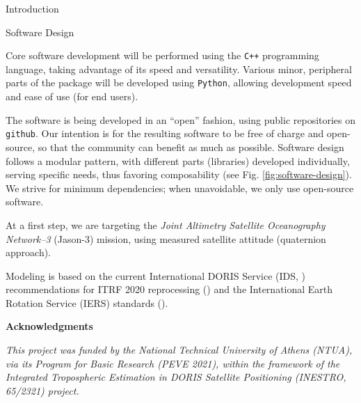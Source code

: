 \documentclass[final,a0,portrait]{beamer}
\newlength{\onecolwid}
\begin{document}
\begin{frame}[t]
\begin{columns}[t]
\begin{column}{\onecolwid}
\begin{block}{Introduction}
\end{block}

\begin{block}{Software Design}
{\small
Core software development will be performed using the \texttt{C++} programming 
language, taking advantage of its speed and versatility. Various minor, 
peripheral parts of the package will be developed using \texttt{Python}, 
allowing development speed and ease of use (for end users).\hfill \break

The software is being developed in an ``open'' fashion, using public 
repositories on \texttt{github}. Our intention is for the resulting software 
to be free of charge and open-source, so that the community can benefit as 
much as possible. Software design follows a modular pattern, with different parts 
(libraries) developed individually, serving specific needs, thus favoring 
composability (see Fig. \ref{fig:software-design}). We strive for minimum 
dependencies; when unavoidable, we only use open-source software. \hfill \break

At a first step, we are targeting the \emph{Joint Altimetry Satellite 
Oceanography Network–3} (Jason-3) mission, using measured satellite attitude 
(quaternion approach). \hfill \break

Modeling is based on the current International DORIS Service (IDS, \cite{10.1007/1345_2015_164} ) recommendations 
for ITRF 2020 reprocessing (\cite{ids-itrf2020-recommendations}) and the 
International Earth Rotation Service (IERS) standards (\cite{iers2010}).
}
\end{block}



\textbf{Acknowledgments}
\par\textit{\footnotesize This project was funded by the National Technical 
University of Athens (NTUA), via its Program for Basic Research (PEVE 2021), 
within the framework of the \emph{Integrated Tropospheric Estimation in DORIS 
Satellite Positioning} (INESTRO, 65/2321) project.}


\end{column}
\end{columns}
\end{frame}
\end{document}
